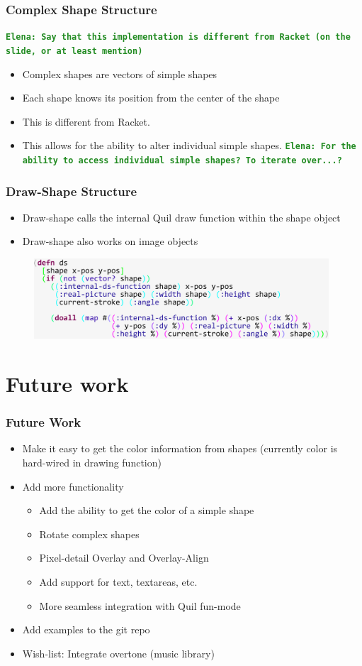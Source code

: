 \documentclass{beamer}
\newcommand{\comment}[1]{{\bf \tt  {#1}}}
\newcommand{\emcomment}[1]{\textcolor{ForestGreen}{\comment{Elena: {#1}}}}
\begin{document}
\begin{frame}
\frametitle{Complex Shape Structure}
\emcomment{Say that this implementation is different from Racket (on the slide, or at least mention)}
	\begin{itemize}
		\item Complex shapes are vectors of simple shapes
		\item Each shape knows its position from the center of the shape
		\item This is different from Racket.
		\item This allows for the ability to alter individual simple shapes. \emcomment{For the ability to access individual simple shapes? To iterate over...?}
	\end{itemize}
\end{frame}

\begin{frame}
\frametitle{Draw-Shape Structure}
	\begin{itemize}
		\item Draw-shape calls the internal Quil draw function within the shape object
		\item Draw-shape also works on image objects
	\end{itemize}
	\begin{figure}
		\includegraphics[width=11cm]{PresentationImages/dsCode.pdf}
	\end{figure}
\end{frame}

\section{Future work}

\begin{frame}
	\frametitle{Future Work}
	\begin{itemize}
		\item Make it easy to get the color information from shapes (currently color is hard-wired in drawing function) 
		\item Add more functionality
		\begin{itemize}
			\item Add the ability to get the color of a simple shape
			\item Rotate complex shapes
			\item Pixel-detail Overlay and Overlay-Align
			\item Add support for text, textareas, etc.  
			\item More seamless integration with Quil fun-mode
		\end{itemize}
		\item Add examples to the git repo 
		\item Wish-list: Integrate overtone (music library)
	\end{itemize}
\end{frame}
\end{document}
